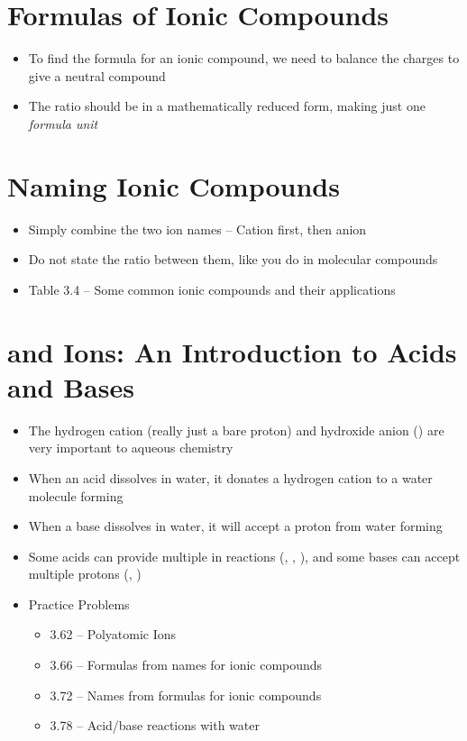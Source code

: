 \documentclass[12pt, openany, letterpaper]{memoir}
\begin{document}
\section{Formulas of Ionic Compounds}
\begin{itemize}
	\item To find the formula for an ionic compound, we need to balance the charges to give a neutral compound
	\item The ratio should be in a mathematically reduced form, making just one \emph{formula unit}
\end{itemize}

\section{Naming Ionic Compounds}
\begin{itemize}
	\item Simply combine the two ion names -- Cation first, then anion
	\item Do not state the ratio between them, like you do in molecular compounds
	\item Table 3.4 -- Some common ionic compounds and their applications
\end{itemize}

\section{ and  Ions: An Introduction to Acids and Bases}
\begin{itemize}
	\item The hydrogen cation (really just a bare proton) and hydroxide anion () are very important to aqueous chemistry
	\item When an acid dissolves in water, it donates a hydrogen cation to a water molecule forming 
	\item When a base dissolves in water, it will accept a proton from water forming 
	\item Some acids can provide multiple  in reactions (, , ), and some bases can accept multiple protons (, )
	\item Practice Problems
	\begin{itemize}		
		\item 3.62 -- Polyatomic Ions
		\item 3.66 -- Formulas from names for ionic compounds
		\item 3.72 -- Names from formulas for ionic compounds
		\item 3.78 -- Acid/base reactions with water
	\end{itemize}
\end{itemize}
\end{document}
